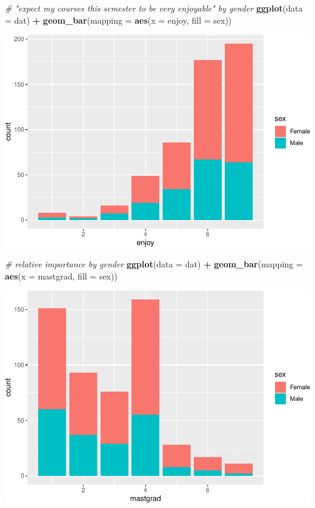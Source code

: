 \documentclass[]{article}
\newenvironment{Shaded}{\begin{snugshade}}{\end{snugshade}}
\newcommand{\CommentTok}[1]{\textcolor[rgb]{0.56,0.35,0.01}{\textit{#1}}}
\newcommand{\DataTypeTok}[1]{\textcolor[rgb]{0.13,0.29,0.53}{#1}}
\newcommand{\KeywordTok}[1]{\textcolor[rgb]{0.13,0.29,0.53}{\textbf{#1}}}
\newcommand{\NormalTok}[1]{#1}
\newcommand{\OperatorTok}[1]{\textcolor[rgb]{0.81,0.36,0.00}{\textbf{#1}}}
\newcommand{\StringTok}[1]{\textcolor[rgb]{0.31,0.60,0.02}{#1}}
\begin{document}
\begin{Shaded}
\begin{Highlighting}[]
\CommentTok{# "expect my courses this semester to be very enjoyable" by gender}
\KeywordTok{ggplot}\NormalTok{(}\DataTypeTok{data =}\NormalTok{ dat) }\OperatorTok{+}\StringTok{ }
\StringTok{  }\KeywordTok{geom_bar}\NormalTok{(}\DataTypeTok{mapping =} \KeywordTok{aes}\NormalTok{(}\DataTypeTok{x =}\NormalTok{ enjoy, }\DataTypeTok{fill =}\NormalTok{ sex))}
\end{Highlighting}
\end{Shaded}

\includegraphics{StudentGoals_files/figure-latex/unnamed-chunk-11-12.pdf}

\begin{Shaded}
\begin{Highlighting}[]
\CommentTok{# relative importance by gender}
\KeywordTok{ggplot}\NormalTok{(}\DataTypeTok{data =}\NormalTok{ dat) }\OperatorTok{+}\StringTok{ }
\StringTok{  }\KeywordTok{geom_bar}\NormalTok{(}\DataTypeTok{mapping =} \KeywordTok{aes}\NormalTok{(}\DataTypeTok{x =}\NormalTok{ mastgrad, }\DataTypeTok{fill =}\NormalTok{ sex))}
\end{Highlighting}
\end{Shaded}

\includegraphics{StudentGoals_files/figure-latex/unnamed-chunk-11-13.pdf}
\end{document}

